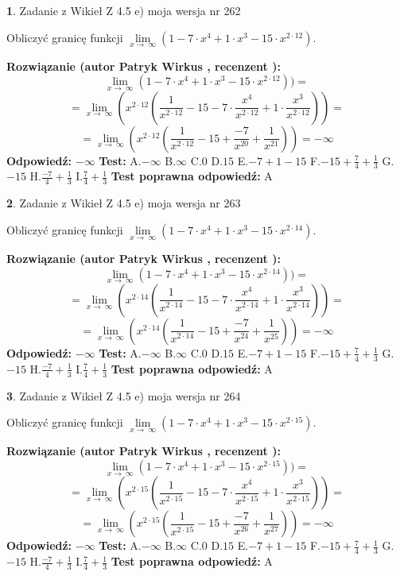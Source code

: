 \documentclass[12pt, a4paper]{article}
\theoremstyle{definition} %
\newtheorem{zad}{}
\newcommand{\zadStart}[1]{\begin{zad}#1\newline}
\newcommand{\zadStop}{\end{zad}}
\newcommand{\rozwStart}[2]{\noindent \textbf{Rozwiązanie (autor #1 , recenzent #2): }\newline}
\newcommand{\rozwStop}{\newline}
\newcommand{\odpStart}{\noindent \textbf{Odpowiedź:}\newline}
\newcommand{\odpStop}{\newline}
\newcommand{\testStart}{\noindent \textbf{Test:}\newline}
\newcommand{\testStop}{\newline}
\newcommand{\kluczStart}{\noindent \textbf{Test poprawna odpowiedź:}\newline}
\newcommand{\kluczStop}{\newline}
\begin{document}
\zadStart{Zadanie z Wikieł Z 4.5 e) moja wersja nr 262}



Obliczyć granicę funkcji  $\lim\limits_{x\to\ \infty}(1 - 7 \cdot x^{4}+1 \cdot x^{3}- 15 \cdot x^{2\cdot12})$.
\zadStop
\rozwStart{Patryk Wirkus}{}
$$\lim\limits_{x\to\ \infty}(1 - 7 \cdot x^{4}+1 \cdot x^{3}- 15 \cdot x^{2\cdot12}))=$$
$$=\lim\limits_{x\to\ \infty}(x^{2\cdot12}(\frac{1}{x^{2\cdot12}}-15 -7 \cdot \frac{x^{4}}{x^{2\cdot12}}+1 \cdot \frac{x^{3}}{x^{2\cdot12}}))=$$
$$=\lim\limits_{x\to\ \infty}(x^{2\cdot12}(\frac{1}{x^{2\cdot12}}-15 + \frac{-7}{x^{20}}+ \frac{1}{x^{21}}))=-\infty$$
\rozwStop
\odpStart
$-\infty$
\odpStop
\testStart
A.$-\infty$ B.$\infty$ C.$0$ D.$15$ E.$-7 + 1 - 15$
F.$-15+\frac{7}{4}+\frac{1}{3}$ G.$-15$
H.$\frac{-7}{4}+\frac{1}{3}$
I.$\frac{7}{4}+\frac{1}{3}$
\testStop
\kluczStart
A
\kluczStop



\zadStart{Zadanie z Wikieł Z 4.5 e) moja wersja nr 263}



Obliczyć granicę funkcji  $\lim\limits_{x\to\ \infty}(1 - 7 \cdot x^{4}+1 \cdot x^{3}- 15 \cdot x^{2\cdot14})$.
\zadStop
\rozwStart{Patryk Wirkus}{}
$$\lim\limits_{x\to\ \infty}(1 - 7 \cdot x^{4}+1 \cdot x^{3}- 15 \cdot x^{2\cdot14}))=$$
$$=\lim\limits_{x\to\ \infty}(x^{2\cdot14}(\frac{1}{x^{2\cdot14}}-15 -7 \cdot \frac{x^{4}}{x^{2\cdot14}}+1 \cdot \frac{x^{3}}{x^{2\cdot14}}))=$$
$$=\lim\limits_{x\to\ \infty}(x^{2\cdot14}(\frac{1}{x^{2\cdot14}}-15 + \frac{-7}{x^{24}}+ \frac{1}{x^{25}}))=-\infty$$
\rozwStop
\odpStart
$-\infty$
\odpStop
\testStart
A.$-\infty$ B.$\infty$ C.$0$ D.$15$ E.$-7 + 1 - 15$
F.$-15+\frac{7}{4}+\frac{1}{3}$ G.$-15$
H.$\frac{-7}{4}+\frac{1}{3}$
I.$\frac{7}{4}+\frac{1}{3}$
\testStop
\kluczStart
A
\kluczStop



\zadStart{Zadanie z Wikieł Z 4.5 e) moja wersja nr 264}



Obliczyć granicę funkcji  $\lim\limits_{x\to\ \infty}(1 - 7 \cdot x^{4}+1 \cdot x^{3}- 15 \cdot x^{2\cdot15})$.
\zadStop
\rozwStart{Patryk Wirkus}{}
$$\lim\limits_{x\to\ \infty}(1 - 7 \cdot x^{4}+1 \cdot x^{3}- 15 \cdot x^{2\cdot15}))=$$
$$=\lim\limits_{x\to\ \infty}(x^{2\cdot15}(\frac{1}{x^{2\cdot15}}-15 -7 \cdot \frac{x^{4}}{x^{2\cdot15}}+1 \cdot \frac{x^{3}}{x^{2\cdot15}}))=$$
$$=\lim\limits_{x\to\ \infty}(x^{2\cdot15}(\frac{1}{x^{2\cdot15}}-15 + \frac{-7}{x^{26}}+ \frac{1}{x^{27}}))=-\infty$$
\rozwStop
\odpStart
$-\infty$
\odpStop
\testStart
A.$-\infty$ B.$\infty$ C.$0$ D.$15$ E.$-7 + 1 - 15$
F.$-15+\frac{7}{4}+\frac{1}{3}$ G.$-15$
H.$\frac{-7}{4}+\frac{1}{3}$
I.$\frac{7}{4}+\frac{1}{3}$
\testStop
\kluczStart
A
\kluczStop
\end{document}
